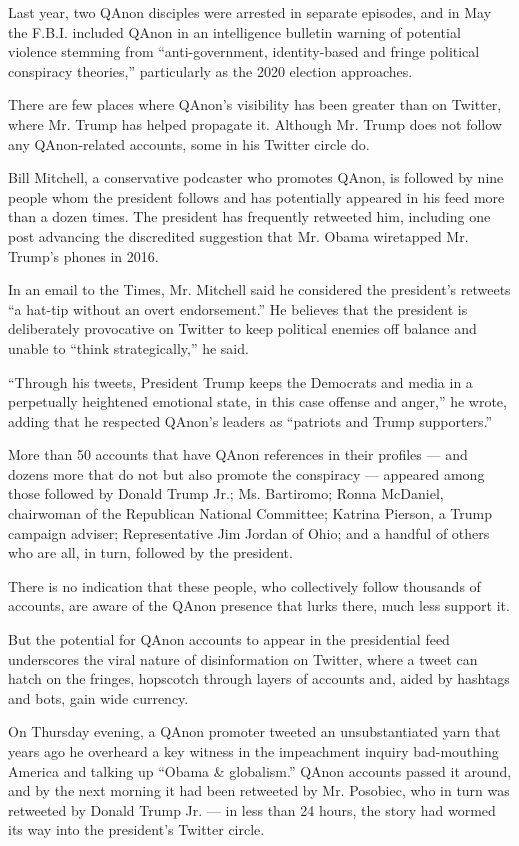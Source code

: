 Last year, two QAnon disciples were arrested in separate episodes, and
in May the F.B.I. included QAnon in an intelligence bulletin warning of
potential violence stemming from ``anti-government, identity-based and
fringe political conspiracy theories,'' particularly as the 2020
election approaches.

There are few places where QAnon's visibility has been greater than on
Twitter, where Mr. Trump has helped propagate it. Although Mr. Trump
does not follow any QAnon-related accounts, some in his Twitter circle
do.

Bill Mitchell, a conservative podcaster who promotes QAnon, is followed
by nine people whom the president follows and has potentially appeared
in his feed more than a dozen times. The president has frequently
retweeted him, including one post advancing the discredited suggestion
that Mr. Obama wiretapped Mr. Trump's phones in 2016.

In an email to the Times, Mr. Mitchell said he considered the
president's retweets ``a hat-tip without an overt endorsement.'' He
believes that the president is deliberately provocative on Twitter to
keep political enemies off balance and unable to ``think
strategically,'' he said.

``Through his tweets, President Trump keeps the Democrats and media in a
perpetually heightened emotional state, in this case offense and
anger,'' he wrote, adding that he respected QAnon's leaders as
``patriots and Trump supporters.''

More than 50 accounts that have QAnon references in their profiles ---
and dozens more that do not but also promote the conspiracy --- appeared
among those followed by Donald Trump Jr.; Ms. Bartiromo; Ronna McDaniel,
chairwoman of the Republican National Committee; Katrina Pierson, a
Trump campaign adviser; Representative Jim Jordan of Ohio; and a handful
of others who are all, in turn, followed by the president.

There is no indication that these people, who collectively follow
thousands of accounts, are aware of the QAnon presence that lurks there,
much less support it.

But the potential for QAnon accounts to appear in the presidential feed
underscores the viral nature of disinformation on Twitter, where a tweet
can hatch on the fringes, hopscotch through layers of accounts and,
aided by hashtags and bots, gain wide currency.

On Thursday evening, a QAnon promoter tweeted an unsubstantiated yarn
that years ago he overheard a key witness in the impeachment inquiry
bad-mouthing America and talking up ``Obama \& globalism.'' QAnon
accounts passed it around, and by the next morning it had been retweeted
by Mr. Posobiec, who in turn was retweeted by Donald Trump Jr. --- in
less than 24 hours, the story had wormed its way into the president's
Twitter circle.

